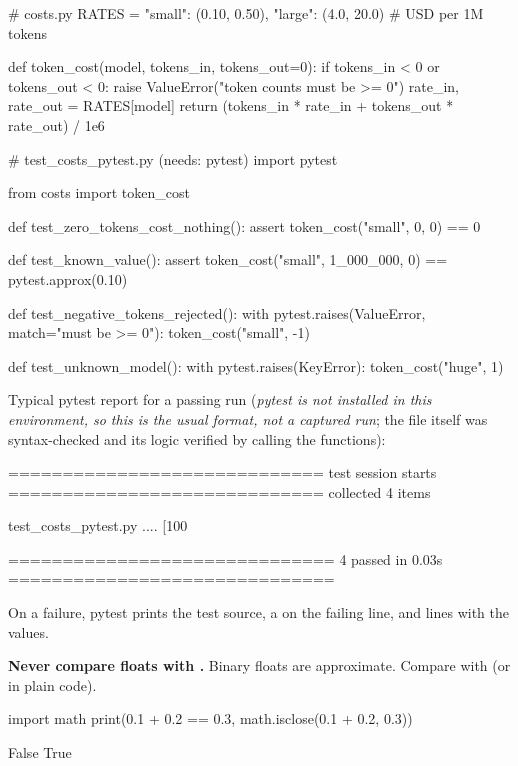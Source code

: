 \begin{pycode}
# costs.py
RATES = {"small": (0.10, 0.50), "large": (4.0, 20.0)}   # USD per 1M tokens

def token_cost(model, tokens_in, tokens_out=0):
    if tokens_in < 0 or tokens_out < 0:
        raise ValueError("token counts must be >= 0")
    rate_in, rate_out = RATES[model]
    return (tokens_in * rate_in + tokens_out * rate_out) / 1e6
\end{pycode}

\begin{pycode}
# test_costs_pytest.py   (needs: pytest)
import pytest

from costs import token_cost


def test_zero_tokens_cost_nothing():
    assert token_cost("small", 0, 0) == 0


def test_known_value():
    assert token_cost("small", 1_000_000, 0) == pytest.approx(0.10)


def test_negative_tokens_rejected():
    with pytest.raises(ValueError, match="must be >= 0"):
        token_cost("small", -1)


def test_unknown_model():
    with pytest.raises(KeyError):
        token_cost("huge", 1)
\end{pycode}

Typical pytest report for a passing run (\emph{pytest is not installed in this environment, so this is the usual
format, not a captured run}; the file itself was syntax-checked and its logic verified by calling the functions):

\begin{rawcode}
============================= test session starts =============================
collected 4 items

test_costs_pytest.py ....                                               [100%

============================== 4 passed in 0.03s ==============================
\end{rawcode}

On a failure, pytest prints the test source, a \code{>} on the failing line, and  lines with the values.

\begin{trap}
\textbf{Never compare floats with \code{==}.} Binary floats are approximate. Compare with 
(or  in plain code).
\begin{pycode}
import math
print(0.1 + 0.2 == 0.3, math.isclose(0.1 + 0.2, 0.3))
\end{pycode}
\begin{rawcode}
False True
\end{rawcode}
\end{trap}

